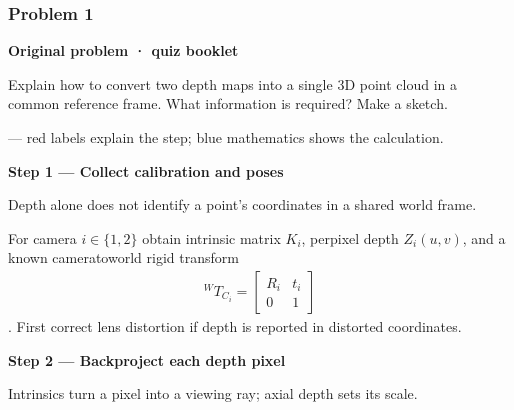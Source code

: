 \documentclass[letterpaper,11pt,english,openany,oneside]{jupyterBook}
\begin{document}
\subsubsection{Problem 1}
\label{\detokenize{lectures/lecture01/quiz-workbook:problem-1}}\label{\detokenize{lectures/lecture01/quiz-workbook:quiz-18-q1}}\label{\detokenize{lectures/lecture01/quiz-workbook:ex-lec01-depth}}
\par\medskip\textbf{Original problem · quiz booklet}\par\smallskip

\sphinxAtStartPar
Explain how to convert two depth maps into a single 3D point cloud in a common reference frame. What information is required? Make a sketch.

\par\medskip

\sphinxAtStartPar
{} — red labels explain the step; blue mathematics shows the calculation.

\par\medskip{}
{\color{QuizStepRed}\bfseries Step 1 — Collect calibration and poses}\par\smallskip

\sphinxAtStartPar
{} Depth alone does not identify a point’s coordinates in a shared world frame.

\sphinxAtStartPar
For camera {\color{QuizMathBlue} \(i\in\{1,2\}\)} obtain intrinsic matrix {\color{QuizMathBlue} \(K_i\)}, per\sphinxhyphen{}pixel depth {\color{QuizMathBlue} \(Z_i(u,v)\)}, and a known camera\sphinxhyphen{}to\sphinxhyphen{}world rigid transform
{\color{QuizMathBlue} \begin{equation*}
\begin{split}
^{W}T_{C_i}=\begin{bmatrix}R_i&t_i\\0&1\end{bmatrix}
\end{split}
\end{equation*}}
\sphinxAtStartPar
. First correct lens distortion if depth is reported in distorted coordinates.

\par

\par\medskip{}
{\color{QuizStepRed}\bfseries Step 2 — Backproject each depth pixel}\par\smallskip

\sphinxAtStartPar
{} Intrinsics turn a pixel into a viewing ray; axial depth sets its scale.
\end{document}
